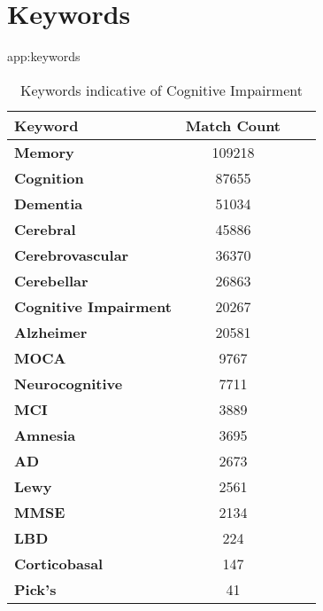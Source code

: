\documentclass[pmlr,twocolumn,10pt]{jmlr} %
\begin{document}
\section{Keywords} 
\begin{table}[hbtp] 
\floatconts
{app:keywords}
    \begin{tabular}{lccc}
        \toprule
        \bfseries Keyword & \bfseries Match Count\\
        \midrule
        
        \bfseries Memory & 109218 \\ 
        \bfseries Cognition  & 87655 \\ 
        \bfseries Dementia & 51034 \\ 
        \bfseries Cerebral & 45886 \\ 
        \bfseries Cerebrovascular & 36370 \\ 
        \bfseries Cerebellar & 26863 \\
        \bfseries Cognitive Impairment & 20267 \\ 
        \bfseries Alzheimer & 20581 \\ 
        \bfseries MOCA & 9767 \\ 
        \bfseries Neurocognitive & 7711 \\ 
        \bfseries MCI & 3889 \\ 
        \bfseries Amnesia & 3695 \\ 
        \bfseries AD & 2673 \\ 
        \bfseries Lewy & 2561 \\ 
        \bfseries MMSE & 2134 \\ 
        \bfseries LBD & 224 \\ 
        \bfseries Corticobasal & 147 \\ 
        \bfseries Pick's & 41 \\ 
        
        \bottomrule
        \end{tabular}
        
        {\caption{Keywords indicative of Cognitive Impairment}} \\
\end{table}

\end{document}
